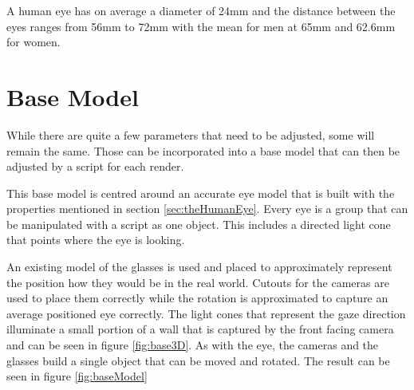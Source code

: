 A human eye has on average a diameter of 24mm and the distance between the eyes ranges from 56mm to 72mm with the mean for men at 65mm and 62.6mm for women. \cite{gross:opticalSystems}
\section{Base Model}
\label{sec:theModel}

While there are quite a few parameters that need to be adjusted, some will remain the same. Those can be incorporated into a base model that can then be adjusted by a script for each render.

This base model is centred around an accurate eye model that is built with the properties mentioned in section \ref{sec:theHumanEye}. Every eye is a group that can be manipulated with a script as one object. This includes a directed light cone that points where the eye is looking.

An existing model of the glasses is used and placed to approximately represent the position how they would be in the real world. Cutouts for the cameras are used to place them correctly while the rotation is approximated to capture an average positioned eye correctly. The light cones that represent the gaze direction illuminate a small portion of a wall that is captured by the front facing camera and can be seen in figure \ref{fig:base3D}. As with the eye, the cameras and the glasses build a single object that can be moved and rotated. The result can be seen in figure \ref{fig:baseModel} 

